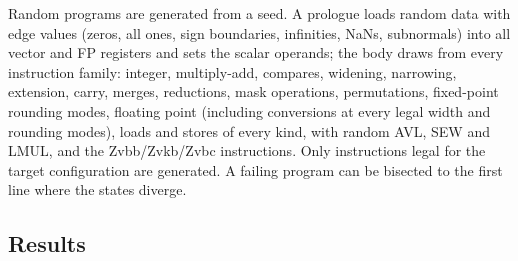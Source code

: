 \documentclass[11pt]{article}
\begin{document}
Random programs are generated from a seed. A prologue loads random data with edge values (zeros,
all ones, sign boundaries, infinities, NaNs, subnormals) into all vector and FP registers and
sets the scalar operands; the body draws from every instruction family: integer, multiply-add,
compares, widening, narrowing, extension, carry, merges, reductions, mask operations,
permutations, fixed-point rounding modes, floating point (including conversions at every legal
width and rounding modes), loads and stores of every kind,  with random AVL, SEW and
LMUL, and the Zvbb/Zvkb/Zvbc instructions. Only instructions legal for the target configuration
are generated. A failing program can be bisected to the first line where the states diverge.

\subsection{Results}
\end{document}
